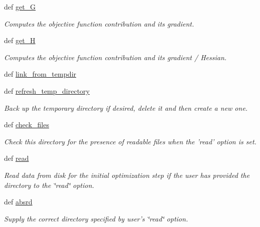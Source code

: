 \begin{DoxyCompactItemize}
def \hyperlink{classforcebalance_1_1target_1_1Target_afa8cc38c8bba8861c072e789717aa049}{get\-\_\-\-G}
\begin{DoxyCompactList}\small\item\em Computes the objective function contribution and its gradient. \end{DoxyCompactList}\item 
def \hyperlink{classforcebalance_1_1target_1_1Target_a1d2ee27fe86a09769c1816af23b09adb}{get\-\_\-\-H}
\begin{DoxyCompactList}\small\item\em Computes the objective function contribution and its gradient / Hessian. \end{DoxyCompactList}\item 
def \hyperlink{classforcebalance_1_1target_1_1Target_a5aa4958cea0a48138511567a076c5a82}{link\-\_\-from\-\_\-tempdir}
\item 
def \hyperlink{classforcebalance_1_1target_1_1Target_afe815eafab06ac92f10bbf4b88ad95c8}{refresh\-\_\-temp\-\_\-directory}
\begin{DoxyCompactList}\small\item\em Back up the temporary directory if desired, delete it and then create a new one. \end{DoxyCompactList}\item 
def \hyperlink{classforcebalance_1_1target_1_1Target_ac790529c5f85f0547fe3601ad1cf2419}{check\-\_\-files}
\begin{DoxyCompactList}\small\item\em Check this directory for the presence of readable files when the 'read' option is set. \end{DoxyCompactList}\item 
def \hyperlink{classforcebalance_1_1target_1_1Target_afb87b4d33b88bb381c74b76752c5892a}{read}
\begin{DoxyCompactList}\small\item\em Read data from disk for the initial optimization step if the user has provided the directory to the \char`\"{}read\char`\"{} option. \end{DoxyCompactList}\item 
def \hyperlink{classforcebalance_1_1target_1_1Target_abb0a6089d8deaead8f78186cc8e4cbe4}{absrd}
\begin{DoxyCompactList}\small\item\em Supply the correct directory specified by user's \char`\"{}read\char`\"{} option. \end{DoxyCompactList}\item 

\end{DoxyCompactItemize}
